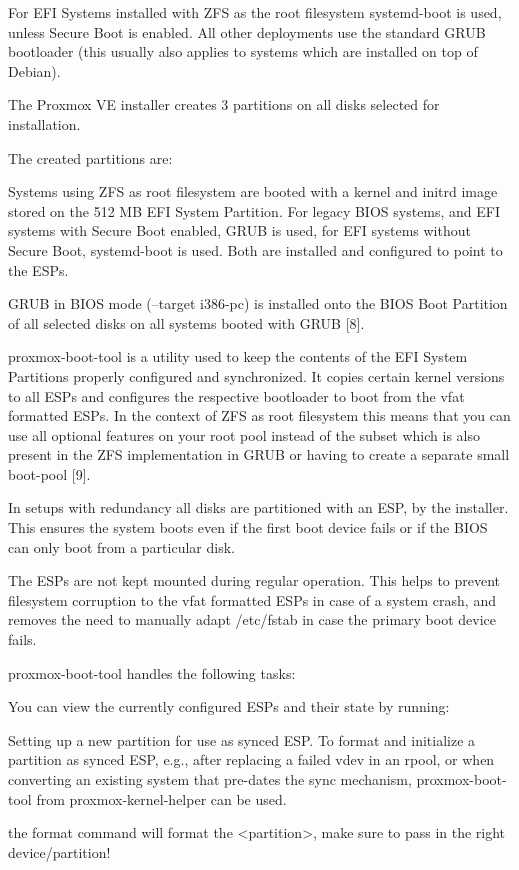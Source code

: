 For EFI Systems installed with ZFS as the root filesystem systemd-boot is used, unless Secure Boot is enabled. All other deployments use the standard GRUB bootloader (this usually also applies to systems which are installed on top of Debian).

The Proxmox VE installer creates 3 partitions on all disks selected for installation.

The created partitions are:

Systems using ZFS as root filesystem are booted with a kernel and initrd image stored on the 512 MB EFI System Partition. For legacy BIOS systems, and EFI systems with Secure Boot enabled, GRUB is used, for EFI systems without Secure Boot, systemd-boot is used. Both are installed and configured to point to the ESPs.

GRUB in BIOS mode (--target i386-pc) is installed onto the BIOS Boot Partition of all selected disks on all systems booted with GRUB [8].

proxmox-boot-tool is a utility used to keep the contents of the EFI System Partitions properly configured and synchronized. It copies certain kernel versions to all ESPs and configures the respective bootloader to boot from the vfat formatted ESPs. In the context of ZFS as root filesystem this means that you can use all optional features on your root pool instead of the subset which is also present in the ZFS implementation in GRUB or having to create a separate small boot-pool [9].

In setups with redundancy all disks are partitioned with an ESP, by the installer. This ensures the system boots even if the first boot device fails or if the BIOS can only boot from a particular disk.

The ESPs are not kept mounted during regular operation. This helps to prevent filesystem corruption to the vfat formatted ESPs in case of a system crash, and removes the need to manually adapt /etc/fstab in case the primary boot device fails.

proxmox-boot-tool handles the following tasks:

You can view the currently configured ESPs and their state by running:

Setting up a new partition for use as synced ESP. To format and initialize a partition as synced ESP, e.g., after replacing a failed vdev in an rpool, or when converting an existing system that pre-dates the sync mechanism, proxmox-boot-tool from proxmox-kernel-helper can be used.

the format command will format the <partition>, make sure to pass in the right device/partition!


